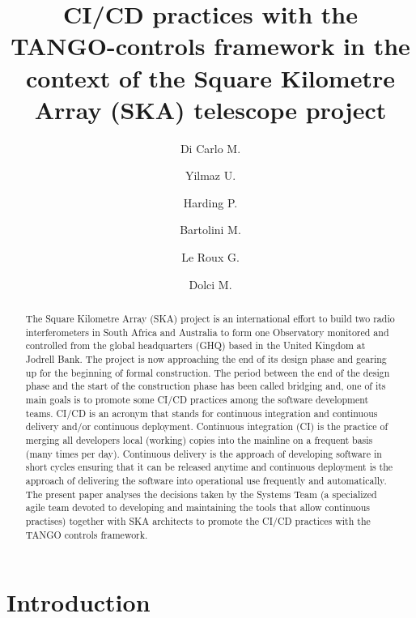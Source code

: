 \documentclass[a4paper]{spie}  %
\title{CI/CD practices with the TANGO-controls framework in the context of the Square Kilometre Array (SKA) telescope project}
\author[a]{Di Carlo M.}
\author[b]{Yilmaz U.}
\author[b]{Harding P.}
\author[b]{Bartolini M.}
\author[c]{Le Roux G.}
\author[a]{Dolci M.}
\affil[a]{INAF Osservatorio Astronomico d'Abruzzo, Teramo, Italy}
\affil[b]{SKA Organisation, Macclesfield, UK}
\affil[c]{SKA South Africa, SA}
\begin{document}
\maketitle

\begin{abstract}
The Square Kilometre Array (SKA) project is an international effort to build two radio interferometers in South Africa and Australia to form one Observatory monitored and controlled from the global headquarters (GHQ) based in the United Kingdom at Jodrell Bank. The project is now approaching the end of its design phase and gearing up for the beginning of formal construction. The period between the end of the design phase and the start of the construction phase has been called bridging and, one of its main goals is to promote some CI/CD practices among the software development teams. CI/CD is an acronym that stands for continuous integration and continuous delivery and/or continuous deployment. Continuous integration (CI) is the practice of merging all developers local (working) copies into the mainline on a frequent basis (many times per day). Continuous delivery is the approach of developing software in short cycles ensuring that it can be released anytime and continuous deployment is the approach of delivering the software into operational use frequently and automatically. The present paper analyses the decisions taken by the Systems Team (a specialized agile team devoted to developing and maintaining the tools that allow continuous practises) together with SKA architects to promote the CI/CD practices with the TANGO controls framework.
\end{abstract}


\section{Introduction}
\label{sec:intro}  %
\end{document}
